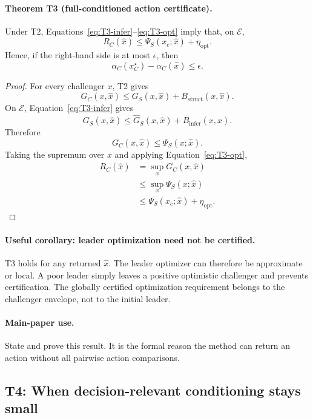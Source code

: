 \paragraph{Theorem T3 (full-conditioned action certificate).}
Under T2, Equations~\eqref{eq:T3-infer}--\eqref{eq:T3-opt} imply that, on
$\mathcal E$,
\begin{equation}
    R_C(\widehat x)
    \le
    \Psi_S(x_c;\widehat x)+\eta_{\mathrm{opt}}.
    \label{eq:T3-certificate}
\end{equation}
Hence, if the right-hand side is at most $\epsilon$, then
\[
    \alpha_C(x_C^\star)-\alpha_C(\widehat x)\le\epsilon.
\]

\begin{proof}
For every challenger $x$, T2 gives
\[
    G_C(x,\widehat x)
    \le G_S(x,\widehat x)+B_{\mathrm{struct}}(x,\widehat x).
\]
On $\mathcal E$, Equation~\eqref{eq:T3-infer} gives
\[
    G_S(x,\widehat x)
    \le \widehat G_S(x,\widehat x)+B_{\mathrm{infer}}(x,\widehat x).
\]
Therefore
\[
    G_C(x,\widehat x)\le\Psi_S(x;\widehat x).
\]
Taking the supremum over $x$ and applying Equation~\eqref{eq:T3-opt},
\begin{align*}
    R_C(\widehat x)
    &=\sup_x G_C(x,\widehat x)\\
    &\le\sup_x\Psi_S(x;\widehat x)\\
    &\le\Psi_S(x_c;\widehat x)+\eta_{\mathrm{opt}}.
\end{align*}
\end{proof}

\paragraph{Useful corollary: leader optimization need not be certified.}
T3 holds for any returned $\widehat x$.  The leader optimizer can therefore be
approximate or local.  A poor leader simply leaves a positive optimistic
challenger and prevents certification.  The globally certified optimization
requirement belongs to the challenger envelope, not to the initial leader.

\paragraph{Main-paper use.}
State and prove this result.  It is the formal reason the method can return an
action without all pairwise action comparisons.

\subsection{T4: When decision-relevant conditioning stays small}

